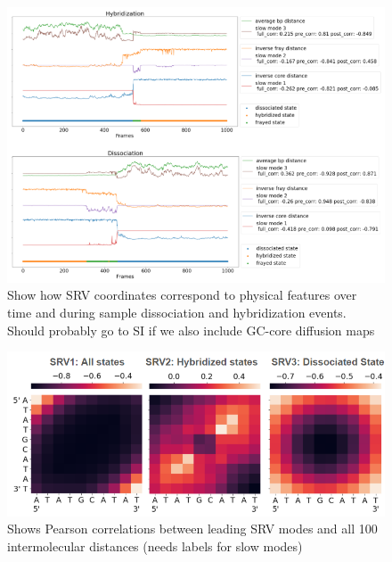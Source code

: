\documentclass[journal=jpcbfk,manuscript=article]{achemso}
\begin{document}
\begin{figure}[ht!]
	\begin{center}
        \includegraphics[width=\textwidth]{Figs/figs_0804/GC-core_tracking_modes.png}
        \caption{Show how SRV coordinates correspond to physical features over time and during sample dissociation and hybridization events. Should probably go to SI if we also include GC-core diffusion maps}
        \label{fig:GC-core_tracking_modes}
	\end{center}
\end{figure}    

\begin{figure}[ht!]
	\begin{center}
        \includegraphics[width=\textwidth]{Figs/figs_0804/GC-core_srv_correlations_by_state.png}
        \caption{Shows Pearson correlations between leading SRV modes and all 100 intermolecular distances (needs labels for slow modes)}
        \label{fig:GC-core_srv_correlations}
	\end{center}
\end{figure}
\end{document}
